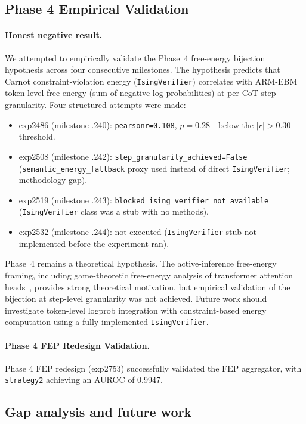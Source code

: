 \documentclass[10pt]{article}
\begin{document}
\subsection{Phase 4 Empirical Validation}

\paragraph{Honest negative result.}
We attempted to empirically validate the Phase~4 free-energy bijection
hypothesis across four consecutive milestones. The hypothesis predicts that
Carnot constraint-violation energy (\texttt{IsingVerifier}) correlates with
ARM-EBM~\cite{wu2025arm-ebm,tan2025rltunedebm} token-level free energy (sum of negative
log-probabilities) at per-CoT-step granularity. Four structured attempts were
made:
\begin{itemize}
  \item exp2486 (milestone .240): \texttt{pearsonr=0.108}, $p=0.28$---below the
        $\lvert r\rvert > 0.30$ threshold.
  \item exp2508 (milestone .242): \texttt{step\_granularity\_achieved=False}
        (\texttt{semantic\_energy\_fallback} proxy used instead of direct
        \texttt{IsingVerifier}; methodology gap).
  \item exp2519 (milestone .243): \texttt{blocked\_ising\_verifier\_not\_available}
        (\texttt{IsingVerifier} class was a stub with no methods).
  \item exp2532 (milestone .244): not executed (\texttt{IsingVerifier} stub not
        implemented before the experiment ran).
\end{itemize}
Phase~4 remains a theoretical hypothesis. The active-inference free-energy
framing, including game-theoretic free-energy analysis of transformer attention
heads~\cite{bouchaffra2026gamefep}, provides strong
theoretical motivation, but empirical validation of the bijection at
step-level granularity was not achieved. Future work should investigate
token-level logprob integration with constraint-based energy computation using
a fully implemented \texttt{IsingVerifier}.

\paragraph{Phase 4 FEP Redesign Validation.}
Phase 4 FEP redesign (exp2753) successfully validated the FEP aggregator, with \texttt{strategy2} achieving an AUROC of 0.9947.

\subsection{Gap analysis and future work}
\end{document}

